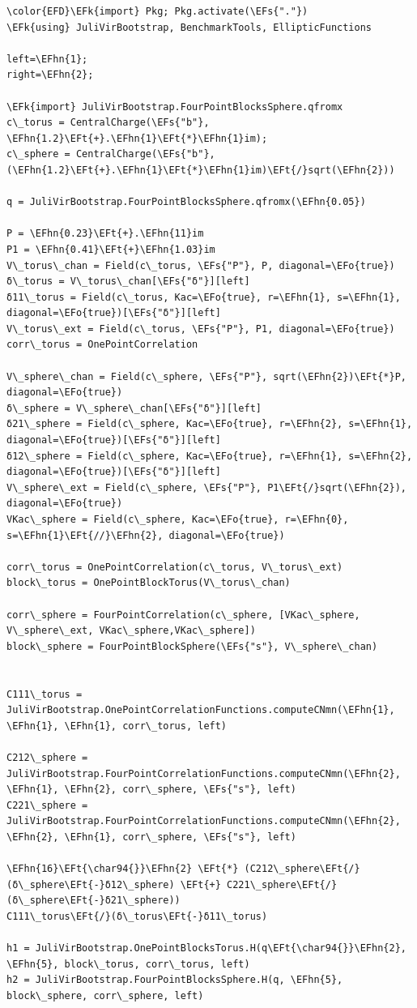 \documentclass[a4paper]{article}
\numberwithin{equation}{section}
\newcommand{\EFs}[1]{\textcolor{EFs}{#1}} %
\newcommand{\EFk}[1]{\textcolor{EFk}{#1}} %
\newcommand{\EFt}[1]{\textcolor{EFt}{#1}} %
\newcommand{\EFo}[1]{\textcolor{EFo}{#1}} %
\newcommand{\EFhn}[1]{\textcolor{EFhn}{#1}} %
\begin{document}
\begin{Code}
\begin{Verbatim}
\color{EFD}\EFk{import} Pkg; Pkg.activate(\EFs{"."})
\EFk{using} JuliVirBootstrap, BenchmarkTools, EllipticFunctions

left=\EFhn{1};
right=\EFhn{2};

\EFk{import} JuliVirBootstrap.FourPointBlocksSphere.qfromx
c\_torus = CentralCharge(\EFs{"b"}, \EFhn{1.2}\EFt{+}.\EFhn{1}\EFt{*}\EFhn{1}im);
c\_sphere = CentralCharge(\EFs{"b"}, (\EFhn{1.2}\EFt{+}.\EFhn{1}\EFt{*}\EFhn{1}im)\EFt{/}sqrt(\EFhn{2}))

q = JuliVirBootstrap.FourPointBlocksSphere.qfromx(\EFhn{0.05})

P = \EFhn{0.23}\EFt{+}.\EFhn{11}im
P1 = \EFhn{0.41}\EFt{+}\EFhn{1.03}im
V\_torus\_chan = Field(c\_torus, \EFs{"P"}, P, diagonal=\EFo{true})
δ\_torus = V\_torus\_chan[\EFs{"δ"}][left]
δ11\_torus = Field(c\_torus, Kac=\EFo{true}, r=\EFhn{1}, s=\EFhn{1}, diagonal=\EFo{true})[\EFs{"δ"}][left]
V\_torus\_ext = Field(c\_torus, \EFs{"P"}, P1, diagonal=\EFo{true})
corr\_torus = OnePointCorrelation

V\_sphere\_chan = Field(c\_sphere, \EFs{"P"}, sqrt(\EFhn{2})\EFt{*}P, diagonal=\EFo{true})
δ\_sphere = V\_sphere\_chan[\EFs{"δ"}][left]
δ21\_sphere = Field(c\_sphere, Kac=\EFo{true}, r=\EFhn{2}, s=\EFhn{1}, diagonal=\EFo{true})[\EFs{"δ"}][left]
δ12\_sphere = Field(c\_sphere, Kac=\EFo{true}, r=\EFhn{1}, s=\EFhn{2}, diagonal=\EFo{true})[\EFs{"δ"}][left]
V\_sphere\_ext = Field(c\_sphere, \EFs{"P"}, P1\EFt{/}sqrt(\EFhn{2}), diagonal=\EFo{true})
VKac\_sphere = Field(c\_sphere, Kac=\EFo{true}, r=\EFhn{0}, s=\EFhn{1}\EFt{//}\EFhn{2}, diagonal=\EFo{true})

corr\_torus = OnePointCorrelation(c\_torus, V\_torus\_ext)
block\_torus = OnePointBlockTorus(V\_torus\_chan)

corr\_sphere = FourPointCorrelation(c\_sphere, [VKac\_sphere, V\_sphere\_ext, VKac\_sphere,VKac\_sphere])
block\_sphere = FourPointBlockSphere(\EFs{"s"}, V\_sphere\_chan)


C111\_torus = JuliVirBootstrap.OnePointCorrelationFunctions.computeCNmn(\EFhn{1}, \EFhn{1}, \EFhn{1}, corr\_torus, left)

C212\_sphere = JuliVirBootstrap.FourPointCorrelationFunctions.computeCNmn(\EFhn{2}, \EFhn{1}, \EFhn{2}, corr\_sphere, \EFs{"s"}, left)
C221\_sphere = JuliVirBootstrap.FourPointCorrelationFunctions.computeCNmn(\EFhn{2}, \EFhn{2}, \EFhn{1}, corr\_sphere, \EFs{"s"}, left)

\EFhn{16}\EFt{\char94{}}\EFhn{2} \EFt{*} (C212\_sphere\EFt{/}(δ\_sphere\EFt{-}δ12\_sphere) \EFt{+} C221\_sphere\EFt{/}(δ\_sphere\EFt{-}δ21\_sphere))
C111\_torus\EFt{/}(δ\_torus\EFt{-}δ11\_torus)

h1 = JuliVirBootstrap.OnePointBlocksTorus.H(q\EFt{\char94{}}\EFhn{2}, \EFhn{5}, block\_torus, corr\_torus, left)
h2 = JuliVirBootstrap.FourPointBlocksSphere.H(q, \EFhn{5}, block\_sphere, corr\_sphere, left)
\end{Verbatim}
\end{Code}
\end{document}
